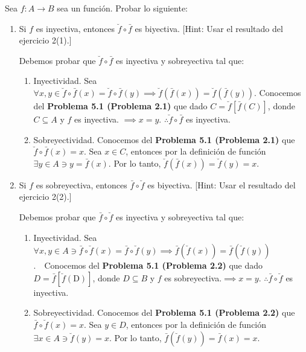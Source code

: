 \begin{problema}[Problema 4]
	Sea $f: A \rightarrow B$ sea un función. Probar lo siguiente: 
	\begin{enumerate}
		\item  Si $f$  es inyectiva, entonces $\breve{f} \circ \bar{f}$ es biyectiva. [Hint: Usar el resultado del ejercicio 2(1).]
		\begin{dem}
			 Debemos probar que $\breve{f} \circ \bar{f}$ es inyectiva y sobreyectiva tal que: 
			\begin{enumerate}
				\item Inyectividad. Sea $\forall x, y \in \breve{f} \circ \bar{f}(x) = \breve{f} \circ \bar{f}(y)\implies \breve{f}(\bar{f}(x))= \breve{f}(\bar{f}(y))$. Conocemos del \textbf{Problema 5.1 (Problema 2.1)} que dado $C=\breve{f}[\bar{f}(C)]$, donde $C\subseteq  A$ y $f$ es inyectiva. $\implies x= y$. $\therefore \breve{f} \circ \bar{f} $ es inyectiva.  
				\item Sobreyectividad. Conocemos del \textbf{Problema 5.1 (Problema 2.1)} que $\breve{f} \circ \bar{f}(x)=x$. Sea $x\in C$, entonces por la definición de función $\exists y \in A  \ni y= \bar{f}(x)$. Por lo tanto, $\breve{f}(\bar{f}(x)) =\breve{f}(y) = x$. 
			\end{enumerate}
		\end{dem}
		\item Si $f$ es sobreyectiva, entonces $\bar{f} \circ \breve{f}$ es biyectiva. [Hint: Usar el resultado del ejercicio 2(2).]
			\begin{dem}
		 Debemos probar que $\bar{f} \circ \breve{f}$ es inyectiva y sobreyectiva tal que: 
			\begin{enumerate}
				\item Inyectividad. Sea $\forall x, y \in A \ni \bar{f} \circ \breve{f}(x)=\bar{f} \circ \breve{f}(y)\implies \bar{f} (\breve{f}(x))=\bar{f} (\breve{f}(y))$.  Conocemos del \textbf{Problema 5.1 (Problema 2.2)} que dado $D=\bar{f}[\breve{f}(\mathrm{D})]$, donde $D\subseteq B$ y $f$ es sobreyectiva.$\implies x= y$. $\therefore \bar{f} \circ \breve{f}$ es inyectiva.
				\item Sobreyectividad. Conocemos del \textbf{Problema 5.1 (Problema 2.2)} que $\bar{f} \circ \breve{f}(x)=x$. Sea $y\in D$, entonces por la definición de función $\exists x \in A\ni \breve{f}(y) = x$. Por lo tanto, $\bar{f}(\breve{f}(y)) =\bar{f}(x) = x$. 
			\end{enumerate} 
		\end{dem}
	\end{enumerate}

\end{problema}
